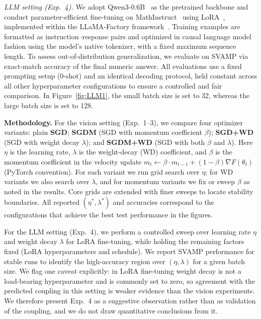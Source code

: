 \emph{LLM setting (Exp.~4).}
We adopt Qwen3-0.6B~\cite{qwen3} as the pretrained backbone and conduct parameter-efficient fine-tuning on MathInstruct~\cite{yue2023mammoth} using LoRA~\cite{hu2021loralowrankadaptationlarge}, implemented within the LLaMA-Factory framework~\cite{zheng2024llamafactory}.
Training examples are formatted as instruction--response pairs and optimized in causal language model fashion using the model's native tokenizer, with a fixed maximum sequence length.
To assess out-of-distribution generalization, we evaluate on SVAMP \citep{patel2021nlp} via exact-match accuracy of the final numeric answer. All evaluations use a fixed prompting setup (0-shot) and an identical decoding protocol, held constant across all other hyperparameter configurations to ensure a controlled and fair comparison.
In Figure~\ref{fig:LLM1}, the small batch size is set to 32, whereas the large batch size is set to 128.

\textbf{Methodology.}
For the vision setting (Exp.~1--3), we compare four optimizer variants: plain \textbf{SGD}; \textbf{SGDM} (SGD with momentum coefficient $\beta$); \textbf{SGD+WD} (SGD with weight decay $\lambda$); and \textbf{SGDM+WD} (SGD with both $\beta$ and $\lambda$). Here $\eta$ is the learning rate, $\lambda$ is the weight-decay (WD) coefficient, and $\beta$ is the momentum coefficient in the velocity update $m_t \leftarrow \beta\cdot m_{t-1} + (1-\beta)\nabla F(\theta_t)$ (PyTorch convention). For each variant we run grid search over $\eta$; for WD variants we also search over $\lambda$, and for momentum variants we fix or sweep $\beta$ as noted in the results. Core grids are extended with finer sweeps to locate stability boundaries. All reported $(\eta^*,\lambda^*)$ and accuracies correspond to the configurations that achieve the best test performance in the figures.

For the LLM setting (Exp.~4), we perform a controlled sweep over learning rate $\eta$ and weight decay $\lambda$ for LoRA fine-tuning, while holding the remaining factors fixed (LoRA hyperparameters and schedule). We report SVAMP performance for stable runs to identify the high-accuracy region over $(\eta,\lambda)$ for a given batch size. We flag one caveat explicitly: in LoRA fine-tuning weight decay is not a load-bearing hyperparameter and is commonly set to zero, so agreement with the predicted coupling in this setting is weaker evidence than the vision experiments. We therefore present Exp.~4 as a suggestive observation rather than as validation of the coupling, and we do not draw quantitative conclusions from it.

